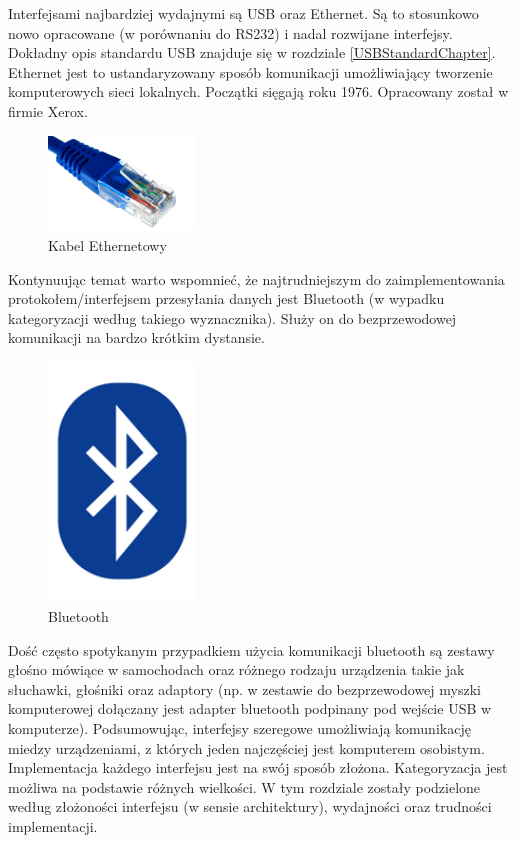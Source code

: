 \documentclass{BscUS}
\begin{document}
\indent Interfejsami najbardziej wydajnymi są USB oraz Ethernet. Są to stosunkowo nowo opracowane (w porównaniu do RS232) i nadal rozwijane interfejsy. Dokładny opis standardu USB znajduje się w rozdziale \ref{USBStandardChapter}. Ethernet jest to ustandaryzowany sposób komunikacji umożliwiający tworzenie komputerowych sieci lokalnych. Początki sięgają roku 1976. Opracowany został w firmie Xerox.
\begin{figure}[H]
\centering
\includegraphics[width=0.35\textwidth]{./img/ethernet-cable}
\caption{Kabel Ethernetowy \cite{ethernetCable}}
\label{fig:EthernetCable}
\end{figure}
Kontynuując temat warto wspomnieć, że najtrudniejszym do zaimplementowania protokołem/interfejsem przesyłania danych jest Bluetooth (w wypadku kategoryzacji według takiego wyznacznika). Służy on do bezprzewodowej komunikacji na bardzo krótkim dystansie.
\begin{figure}[H]
\centering
\includegraphics[width=0.35\textwidth]{./img/bluetooth-logo}
\caption{Bluetooth \cite{bluetooth}}
\label{fig:blueTooth}
\end{figure}
\noindent Dość często spotykanym przypadkiem użycia komunikacji bluetooth są zestawy głośno mówiące w samochodach oraz różnego rodzaju urządzenia takie jak słuchawki, głośniki oraz adaptory (np. w zestawie do bezprzewodowej myszki komputerowej dołączany jest adapter bluetooth podpinany pod wejście USB w komputerze).
\newline
\indent Podsumowując, interfejsy szeregowe umożliwiają komunikację miedzy urządzeniami, z których jeden najczęściej jest komputerem osobistym. Implementacja każdego interfejsu jest na swój sposób złożona. Kategoryzacja jest możliwa na podstawie różnych wielkości. W tym rozdziale zostały podzielone według złożoności interfejsu (w sensie architektury), wydajności oraz trudności implementacji.
\end{document}
